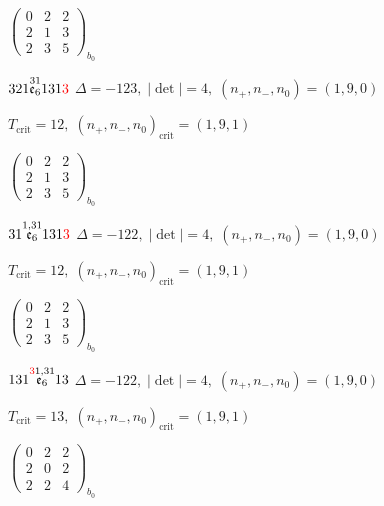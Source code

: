 \documentclass[10pt]{article}
\begin{document}
\hspace{2em}$\left(\begin{smallmatrix}0 & 2 & 2 \\ 2 & 1 & 3 \\ 2 & 3 & 5\end{smallmatrix}\right)_{\!b_0}$

\smallskip

$321\overset{31}{\mathfrak{e}_6}131\textcolor{red}{3}$ \quad $\Delta=-123,\; |\det|=4,\; (n_+,n_-,n_0)=(1,9,0)$

\hspace{1em}$T_{\text{crit}}=12,\; (n_+,n_-,n_0)_{\text{crit}}=(1,9,1)$

\hspace{2em}$\left(\begin{smallmatrix}0 & 2 & 2 \\ 2 & 1 & 3 \\ 2 & 3 & 5\end{smallmatrix}\right)_{\!b_0}$

\smallskip

$31\overset{1,31}{\mathfrak{e}_6}131\textcolor{red}{3}$ \quad $\Delta=-122,\; |\det|=4,\; (n_+,n_-,n_0)=(1,9,0)$

\hspace{1em}$T_{\text{crit}}=12,\; (n_+,n_-,n_0)_{\text{crit}}=(1,9,1)$

\hspace{2em}$\left(\begin{smallmatrix}0 & 2 & 2 \\ 2 & 1 & 3 \\ 2 & 3 & 5\end{smallmatrix}\right)_{\!b_0}$

$131\overset{\textcolor{red}{3}1,31}{\mathfrak{e}_6}13$ \quad $\Delta=-122,\; |\det|=4,\; (n_+,n_-,n_0)=(1,9,0)$

\hspace{1em}$T_{\text{crit}}=13,\; (n_+,n_-,n_0)_{\text{crit}}=(1,9,1)$

\hspace{2em}$\left(\begin{smallmatrix}0 & 2 & 2 \\ 2 & 0 & 2 \\ 2 & 2 & 4\end{smallmatrix}\right)_{\!b_0}$

\smallskip
\end{document}
